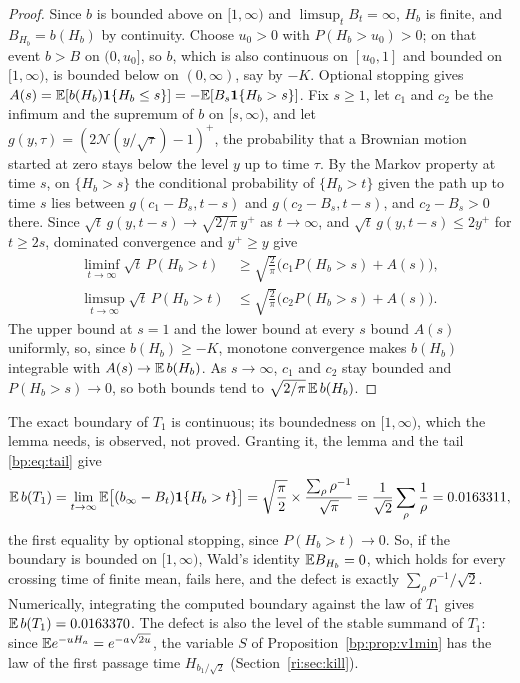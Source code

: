 \begin{proof}
Since $b$ is bounded above on $[1,\infty)$ and $\limsup_tB_t=\infty$, $H_b$ is finite, and $B_{H_b}=b(H_b)$ by continuity. Choose $u_0>0$ with $P(H_b>u_0)>0$; on that event $b>B$ on $(0,u_0]$, so $b$, which is also continuous on $[u_0,1]$ and bounded on $[1,\infty)$, is bounded below on $(0,\infty)$, say by $-K$. Optional stopping gives $A(s)=\mathbb{E}[b(H_b)\mathbf 1\{H_b\le s\}]=-\mathbb{E}[B_s\mathbf 1\{H_b>s\}]$. Fix $s\ge1$, let $c_1$ and $c_2$ be the infimum and the supremum of $b$ on $[s,\infty)$, and let $g(y,\tau)=(2\mathcal N(y/\sqrt\tau)-1)^+$, the probability that a Brownian motion started at zero stays below the level $y$ up to time $\tau$. By the Markov property at time $s$, on $\{H_b>s\}$ the conditional probability of $\{H_b>t\}$ given the path up to time $s$ lies between $g(c_1-B_s,t-s)$ and $g(c_2-B_s,t-s)$, and $c_2-B_s>0$ there. Since $\sqrt t\,g(y,t-s)\to\sqrt{2/\pi}\,y^+$ as $t\to\infty$, and $\sqrt t\,g(y,t-s)\le2y^+$ for $t\ge2s$, dominated convergence and $y^+\ge y$ give
\[
\begin{aligned}
\liminf_{t\to\infty}\sqrt t\,P(H_b>t)&\ge\sqrt{\tfrac2\pi}\big(c_1P(H_b>s)+A(s)\big),\\
\limsup_{t\to\infty}\sqrt t\,P(H_b>t)&\le\sqrt{\tfrac2\pi}\big(c_2P(H_b>s)+A(s)\big).
\end{aligned}
\]
The upper bound at $s=1$ and the lower bound at every $s$ bound $A(s)$ uniformly, so, since $b(H_b)\ge-K$, monotone convergence makes $b(H_b)$ integrable with $A(s)\to\mathbb{E}\,b(H_b)$. As $s\to\infty$, $c_1$ and $c_2$ stay bounded and $P(H_b>s)\to0$, so both bounds tend to $\sqrt{2/\pi}\,\mathbb{E}\,b(H_b)$.
\end{proof}

The exact boundary of $T_1$ is continuous; its boundedness on $[1,\infty)$, which the lemma needs, is observed, not proved. Granting it, the lemma and the tail \eqref{bp:eq:tail} give
\[
\mathbb{E}\,b(T_1)=\lim_{t\to\infty}\mathbb{E}\big[(b_\infty-B_t)\mathbf 1\{H_b>t\}\big]=\sqrt{\frac\pi2}\times\frac{\sum_\rho\rho^{-1}}{\sqrt\pi}=\frac{1}{\sqrt2}\sum_\rho\frac1\rho=0.0163311 ,
\]
the first equality by optional stopping, since $P(H_b>t)\to0$. So, if the boundary is bounded on $[1,\infty)$, Wald's identity $\mathbb{E} B_{H_b}=0$, which holds for every crossing time of finite mean, fails here, and the defect is exactly $\sum_\rho\rho^{-1}/\sqrt2$. Numerically, integrating the computed boundary against the law of $T_1$ gives $\mathbb{E}\,b(T_1)=0.0163370$. The defect is also the level of the stable summand of $T_1$: since $\mathbb{E} e^{-uH_a}=e^{-a\sqrt{2u}}$, the variable $S$ of Proposition~\ref{bp:prop:v1min} has the law of the first passage time $H_{b_1/\sqrt2}$ (Section~\ref{ri:sec:kill}).

